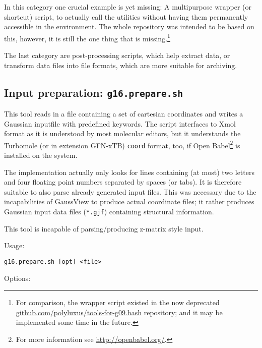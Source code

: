 \documentclass[   %
  final,          %
  a4paper         %
]{article}
\begin{document}
In this category one crucial example is yet missing:
A multipurpose wrapper (or shortcut) script, 
to actually call the utilities without having them permanently accessible 
in the environment.
The whole repository was intended to be based on this, 
however, it is still the one thing that is missing.\footnote{%
  For comparison, the wrapper script existed in the now deprecated
  \href{https://github.com/polyluxus/tools-for-g09.bash}{github.com/polyluxus/tools-for-g09.bash}
  repository; and it may be implemented some time in the future.}

The last category are post-processing scripts, 
which help extract data, or transform data files into file formats,
which are more suitable for archiving.

\subsection{Input preparation: \texorpdfstring{{\lstinline`g16.prepare.sh`}}{g16.prepare.sh}}
\label{sec:g16.prepare}

This tool reads in a file containing a set of cartesian coordinates and
writes a Gaussian inputfile with predefined keywords. 
The script interfaces to Xmol format as it is understood by most molecular editors, 
but it understands the Turbomole (or in extension GFN-xTB) \texttt{coord} format, too,
if Open Babel\footnote{%
  For more information see \href{http://openbabel.org/}{http://openbabel.org/}.}
is installed on the system.

The implementation actually only looks for lines containing (at most) two letters
and four floating point numbers separated by spaces (or tabs).
It is therefore suitable to also parse already generated input files.
This was necessary due to the incapabilities of GaussView to produce
actual coordinate files; it rather produces Gaussian input data files (\texttt{*.gjf}) 
containing structural information.

This tool is incapable of parsing/producing z-matrix style input.

Usage: 

\lstinline`g16.prepare.sh [opt] <file>`

Options:
\end{document}
